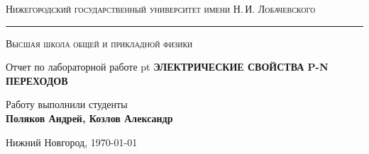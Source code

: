\begin{titlepage}
	\begin{center}
	{\textsc{Нижегородский государственный университет имени Н.\,И. Лобачевского}}
	\vskip 2pt \hrule \vskip 3pt
	{\textsc{Высшая школа общей и прикладной физики}}

	\vfill


	{{\large Отчет по лабораторной работе} pt {\Large \bfseries ЭЛЕКТРИЧЕСКИЕ СВОЙСТВА P-N ПЕРЕХОДОВ}}

		
	\vspace{2cm}
	{\large Работу выполнили студенты \\[0.5em]{\Large \bfseries Поляков Андрей, Козлов Александр}}

	\end{center}

	\vfill

	\begin{center}
	{Нижний Новгород, \today}
	\end{center}
\end{titlepage}